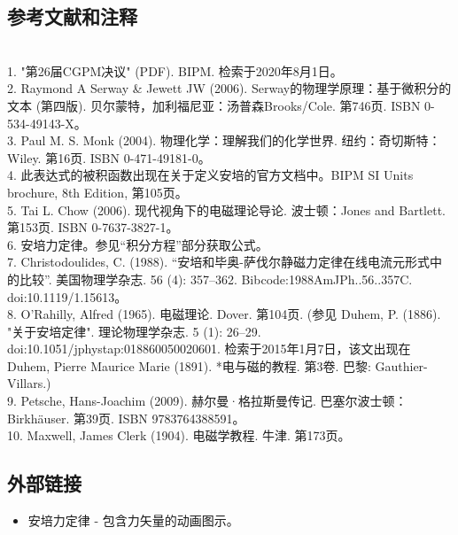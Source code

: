 \subsection{参考文献和注释}\\
1. "第26届CGPM决议" (PDF). BIPM. 检索于2020年8月1日。\\
2. Raymond A Serway & Jewett JW (2006). Serway的物理学原理：基于微积分的文本 (第四版). 贝尔蒙特，加利福尼亚：汤普森Brooks/Cole. 第746页. ISBN 0-534-49143-X。\\
3. Paul M. S. Monk (2004). 物理化学：理解我们的化学世界. 纽约：奇切斯特：Wiley. 第16页. ISBN 0-471-49181-0。\\
4. 此表达式的被积函数出现在关于定义安培的官方文档中。BIPM SI Units brochure, 8th Edition, 第105页。\\
5. Tai L. Chow (2006). 现代视角下的电磁理论导论. 波士顿：Jones and Bartlett. 第153页. ISBN 0-7637-3827-1。\\
6. 安培力定律。参见“积分方程”部分获取公式。\\
7. Christodoulides, C. (1988). “安培和毕奥-萨伐尔静磁力定律在线电流元形式中的比较”. 美国物理学杂志. 56 (4): 357–362. Bibcode:1988AmJPh..56..357C. doi:10.1119/1.15613。\\
8. O'Rahilly, Alfred (1965). 电磁理论. Dover. 第104页. (参见 Duhem, P. (1886). "关于安培定律". 理论物理学杂志. 5 (1): 26–29. doi:10.1051/jphystap:018860050020601. 检索于2015年1月7日，该文出现在 Duhem, Pierre Maurice Marie (1891). *电与磁的教程. 第3卷. 巴黎: Gauthier-Villars.)\\
9. Petsche, Hans-Joachim (2009). 赫尔曼·格拉斯曼传记. 巴塞尔波士顿：Birkhäuser. 第39页. ISBN 9783764388591。\\
10. Maxwell, James Clerk (1904). 电磁学教程. 牛津. 第173页。\\
\subsection{外部链接}
\begin{itemize}
\item 安培力定律 - 包含力矢量的动画图示。
\end{itemize}
